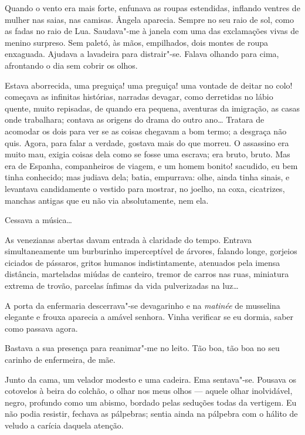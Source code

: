 Quando o vento era mais forte, enfunava as roupas estendidas, inflando
ventres de mulher nas saias, nas camisas. Ângela aparecia. Sempre no
seu raio de sol, como as fadas no raio de Lua. Saudava"-me à janela
com uma das exclamações vivas de menino surpreso. Sem paletó, às mãos,
empilhados, dois montes de roupa enxaguada. Ajudava a lavadeira para
distrair"-se. Falava olhando para cima, afrontando o dia sem cobrir os
olhos. 

Estava aborrecida, uma preguiça! uma preguiça! uma vontade de
deitar no colo! começava as infinitas histórias, narradas devagar, como
derretidas no lábio quente, muito repisadas, de quando era pequena,
aventuras da imigração, as casas onde trabalhara; contava as origens do
drama do outro ano\ldots{} Tratara de acomodar os dois para ver se as coisas
chegavam a bom termo; a desgraça não quis. Agora, para falar a verdade,
gostava mais do que morreu. O assassino era muito mau, exigia coisas
dela como se fosse uma escrava; era bruto, bruto. Mas era de Espanha,
companheiros de viagem, e um homem bonito! sacudido, eu bem tinha
conhecido; mas judiava dela; batia, empurrava: olhe, ainda tinha
sinais, e levantava candidamente o vestido para mostrar, no joelho, na
coxa, cicatrizes, manchas antigas que eu não via absolutamente, nem
ela. 

Cessava a música\ldots{} 


As venezianas abertas davam entrada à
claridade do tempo. Entrava simultaneamente um burburinho imperceptível
de árvores, falando longe, gorjeios ciciados de pássaros, gritos
humanos indistintamente, atenuados pela imensa distância, marteladas
miúdas de canteiro, tremor de carros nas ruas, miniatura extrema de
trovão, parcelas ínfimas da vida pulverizadas na luz\ldots{} 

A porta da
enfermaria descerrava"-se devagarinho e na \textit{matinée} de musselina
elegante e frouxa aparecia a amável senhora. Vinha verificar se eu
dormia, saber como passava agora. 

Bastava a sua presença para
reanimar"-me no leito. Tão boa, tão boa no seu carinho de enfermeira,
de mãe. 

Junto da cama, um velador modesto e uma cadeira. Ema
sentava"-se. Pousava os cotovelos à beira do colchão, o olhar nos meus
olhos --- aquele olhar inolvidável, negro, profundo como um abismo,
bordado pelas seduções todas da vertigem. Eu não podia resistir,
fechava as pálpebras; sentia ainda na pálpebra com o hálito de veludo a
carícia daquela atenção.

